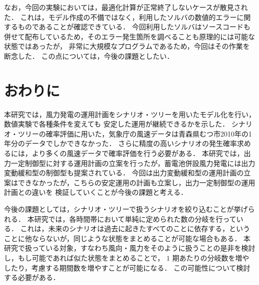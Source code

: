 \documentclass[a4paper,12pt,showkeys]{jreport}
\begin{document}
なお，今回の実験においては，最適化計算が正常終了しないケースが散見された．
これは，モデル作成の不備ではなく，利用したソルバの数値的エラーに関するものであることが確認できている．
今回利用したソルバはソースコードも併せて配布しているため，そのエラー発生箇所を調べることも原理的には可能な状態ではあったが，
非常に大規模なプログラムであるため，今回はその作業を断念した．
この点については，今後の課題としたい．

\chapter{おわりに}
本研究では，風力発電の運用計画をシナリオ・ツリーを用いたモデル化を行い，数値実験で各種条件を変えても
安定した運用が継続できるかを示した．
シナリオ・ツリーの確率評価に用いた，気象庁の風速データは青森県むつ市2010年の1年分のデータでしかできなかった．
さらに精度の高いシナリオの発生確率求めるには，より多くの風速データで確率評価を行う必要がある．
本研究では，出力一定制御型に対する運用計画の立案を行ったが，蓄電池併設風力発電には出力変動緩和型の制御型も提案されている．
今回は出力変動緩和型の運用計画の立案はできなかったが，こちらの安定運用の計画も立案し，出力一定制御型の運用計画との違いを
検証していくことが今後の課題と考える．


今後の課題としては，シナリオ・ツリーで扱うシナリオを絞り込むことが挙げられる．
本研究では，各時間帯において単純に定められた数の分岐を行っている．
これは，未来のシナリオは過去に起きたすべてのことに依存する，ということに他ならないが，同じような状態をまとめることが可能な場合もある．
%
本研究で扱っている対象，すなわち風向・風力をそのように扱うことの是非を検討し，もし可能であれば似た状態をまとめることで，
$1$ 期あたりの分岐数を増やしたり，考慮する期間数を増やすことが可能になる．
この可能性について検討する必要がある．
\end{document}
